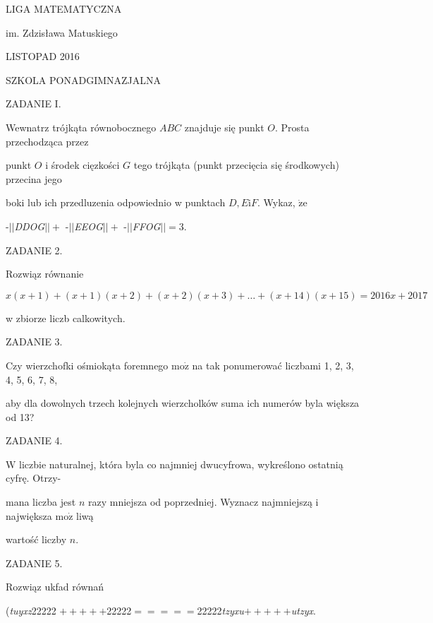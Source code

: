 \documentclass[a4paper,12pt]{article}
\begin{document}
LIGA MATEMATYCZNA

im. Zdzisława Matuskiego

LISTOPAD 2016

SZKOLA PONADGIMNAZJALNA

ZADANIE I.

Wewnatrz trójkąta równobocznego $ABC$ znajduje się punkt $O$. Prosta przechodząca przez

punkt $O$ i środek cięzkości $G$ tego trójkąta (punkt przecięcia się środkowych) przecina jego

boki lub ich przedluzenia odpowiednio w punktach $D, E\mathrm{i}F$. Wykaz, $\dot{\mathrm{z}}\mathrm{e}$

-$||${\it DDOG}$|| +$ -$||${\it EEOG}$|| +$ -$||${\it FFOG}$|| =$3.

ZADANIE 2.

Rozwiąz równanie

$x(x+1)+(x+1)(x+2)+(x+2)(x+3)+\ldots+(x+14)(x+15)=2016x+2017$

w zbiorze liczb calkowitych.

ZADANIE 3.

Czy wierzchofki ośmiokąta foremnego $\mathrm{m}\mathrm{o}\dot{\mathrm{z}}$ na tak ponumerować liczbami 1, 2, 3, 4, 5, 6, 7, 8,

aby dla dowolnych trzech kolejnych wierzcholków suma ich numerów byla większa od 13?

ZADANIE 4.

$\mathrm{W}$ liczbie naturalnej, która byla co najmniej dwucyfrowa, wykreślono ostatnią cyfrę. Otrzy-

mana liczba jest $n$ razy mniejsza od poprzedniej. Wyznacz najmniejszą i największa $\mathrm{m}\mathrm{o}\dot{\mathrm{z}}$ liwą

wartość liczby $n.$

ZADANIE 5.

Rozwiąz ukfad równań

({\it tuyxz}22222 $+++++$22222$=====$22222{\it tzyxu}$+++++${\it utzyx}.
\end{document}

